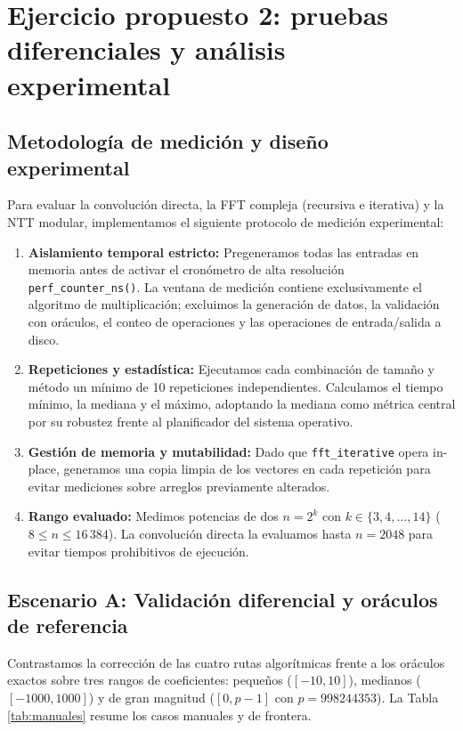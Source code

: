 \section{Ejercicio propuesto 2: pruebas diferenciales y análisis experimental}

\subsection{Metodología de medición y diseño experimental}
Para evaluar la convolución directa, la FFT compleja (recursiva e iterativa) y la NTT modular, implementamos el siguiente protocolo de medición experimental:
\begin{enumerate}
    \item \textbf{Aislamiento temporal estricto:} Pregeneramos todas las entradas en memoria antes de activar el cronómetro de alta resolución \texttt{perf\_counter\_ns()}. La ventana de medición contiene exclusivamente el algoritmo de multiplicación; excluimos la generación de datos, la validación con oráculos, el conteo de operaciones y las operaciones de entrada/salida a disco.
    \item \textbf{Repeticiones y estadística:} Ejecutamos cada combinación de tamaño y método un mínimo de 10 repeticiones independientes. Calculamos el tiempo mínimo, la mediana y el máximo, adoptando la mediana como métrica central por su robustez frente al planificador del sistema operativo.
    \item \textbf{Gestión de memoria y mutabilidad:} Dado que \texttt{fft\_iterative} opera in-place, generamos una copia limpia de los vectores en cada repetición para evitar mediciones sobre arreglos previamente alterados.
    \item \textbf{Rango evaluado:} Medimos potencias de dos $n = 2^k$ con $k \in \{3, 4, \dots, 14\}$ ($8 \le n \le 16\,384$). La convolución directa la evaluamos hasta $n = 2048$ para evitar tiempos prohibitivos de ejecución.
\end{enumerate}

\subsection{Escenario A: Validación diferencial y oráculos de referencia}
Contrastamos la corrección de las cuatro rutas algorítmicas frente a los oráculos exactos sobre tres rangos de coeficientes: pequeños ($[-10, 10]$), medianos ($[-1000, 1000]$) y de gran magnitud ($[0, p-1]$ con $p = 998244353$). La Tabla \ref{tab:manuales} resume los casos manuales y de frontera.

